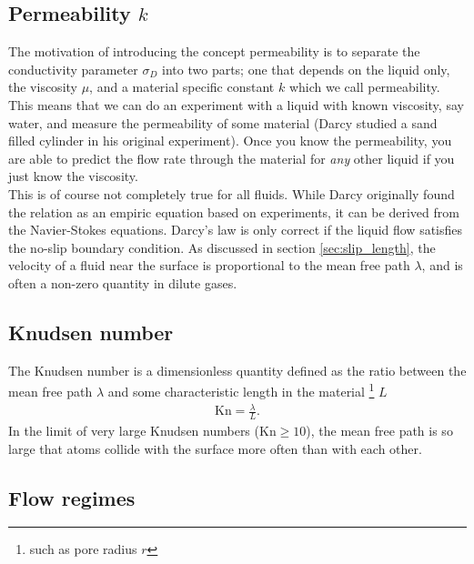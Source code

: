 \subsection{Permeability $k$}
The motivation of introducing the concept permeability is to separate the conductivity parameter $\sigma_D$ into two parts; one that depends on the liquid only, the viscosity $\mu$, and a material specific constant $k$ which we call permeability. This means that we can do an experiment with a liquid with known viscosity, say water, and measure the permeability of some material (Darcy studied a sand filled cylinder in his original experiment). Once you know the permeability, you are able to predict the flow rate through the material for \textit{any} other liquid if you just know the viscosity.\\
This is of course not completely true for all fluids. While Darcy originally found the relation as an empiric equation based on experiments, it can be derived from the Navier-Stokes equations. Darcy's law is only correct if the liquid flow satisfies the no-slip boundary condition. As discussed in section \ref{sec:slip_length}, the velocity of a fluid near the surface is proportional to the mean free path $\lambda$, and is often a non-zero quantity in dilute gases. 
\subsection{Knudsen number}
The Knudsen number is a dimensionless quantity defined as the ratio between the mean free path $\lambda$ and some characteristic length in the material \footnote{such as pore radius $r$} $L$
\begin{align}
	\text{Kn} = \frac{\lambda}{L}.
\end{align}
In the limit of very large Knudsen numbers (Kn$\geq 10$), the mean free path is so large that atoms collide with the surface more often than with each other. 
\subsection{Flow regimes}


